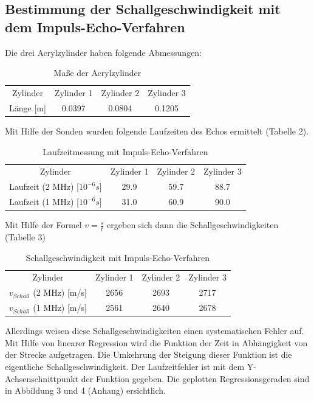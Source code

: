 \documentclass[11pt,ngerman,a4paper]{article}
\begin{document}
\subsection{Bestimmung der Schallgeschwindigkeit mit dem Impuls-Echo-Verfahren}
Die drei Acrylzylinder haben folgende Abmessungen:
 \begin{table}[h]
\centering
 \begin{tabular}{|c||c|c|c|}
 Zylinder & Zylinder 1 & Zylinder 2 & Zylinder 3 \\
  Länge [m] & 0.0397 & 0.0804 & 0.1205 \\
 \end{tabular}
\caption{Maße der Acrylzylinder}
\end{table}
\newline Mit Hilfe der Sonden wurden folgende Laufzeiten des Echos ermittelt (Tabelle 2).
 \begin{table}[h]
\centering
 \begin{tabular}{|c||c|c|c|}
 Zylinder & Zylinder 1 & Zylinder 2 & Zylinder 3 \\
 Laufzeit (2 MHz) [$10^{-6}s$] & 29.9 & 59.7 & 88.7 \\
 Laufzeit (1 MHz) [$10^{-6}s$] & 31.0  & 60.9 & 90.0 \\
 \end{tabular}
\caption{Laufzeitmessung mit Impuls-Echo-Verfahren}
\end{table}
\newline
Mit Hilfe der Formel $v=\frac{s}{t}$ ergeben sich dann die Schallgeschwindigkeiten (Tabelle 3)
\begin{table}[h]
\centering
 \begin{tabular}{|c||c|c|c|}
 Zylinder & Zylinder 1 & Zylinder 2 & Zylinder 3 \\
 $v_{Schall}$ (2 MHz) [m/s] & 2656 & 2693 & 2717 \\
 $v_{Schall}$ (1 MHz) [m/s] & 2561  & 2640 & 2678 \\
 \end{tabular}
\caption{Schallgeschwindigkeit mit Impuls-Echo-Verfahren}
\end{table}
\newline
Allerdings weisen diese Schallgeschwindigkeiten einen systematischen Fehler auf. Mit Hilfe von linearer Regression wird die Funktion der Zeit in Abhängigkeit von der Strecke aufgetragen. Die Umkehrung der Steigung dieser Funktion ist die eigentliche Schallgeschwindigkeit. Der Laufzeitfehler ist mit dem Y-Achsenschnittpunkt der Funktion gegeben. Die geplotten Regressionsgeraden sind in Abbildung 3 und 4 (Anhang) ersichtlich.
\end{document}
